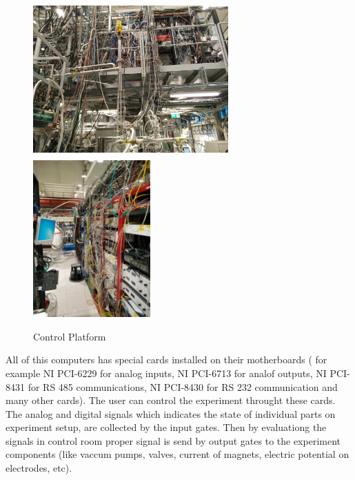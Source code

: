 \documentclass[12pt,a4paper]{article}
\begin{document}
\begin{figure}[h]

\includegraphics[height=60mm, width=75mm]{control_platform-1}
\includegraphics[width=45mm]{control_plattform2}
\caption{Control Platform}
\label{platform}
\end{figure}		
	
All of this computers has special cards installed on their motherboards ( for example NI PCI-6229 for analog inputs, NI PCI-6713 for analof outputs, NI PCI-8431 for RS 485 communications, NI PCI-8430 for RS 232 communication and many other cards). The user can control the experiment throught these cards. The analog and digital signals which indicates the state of individual parts on experiment setup, are collected by the input gates. Then by evaluationg the signals in control room proper signal is send by output gates to the experiment components (like vaccum pumps, valves, current of magnets, electric potential on electrodes, etc).
\end{document}
